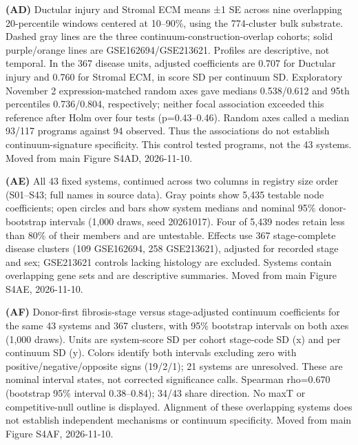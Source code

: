 \textbf{(AD)} Ductular injury and Stromal ECM means ±1 SE across nine overlapping 20-percentile windows centered at 10--90\%, using the 774-cluster bulk substrate. Dashed gray lines are the three continuum-construction-overlap cohorts; solid purple/orange lines are GSE162694/GSE213621. Profiles are descriptive, not temporal. In the 367 disease units, adjusted coefficients are 0.707 for Ductular injury and 0.760 for Stromal ECM, in score SD per continuum SD. Exploratory November 2 expression-matched random axes gave medians 0.538/0.612 and 95th percentiles 0.736/0.804, respectively; neither focal association exceeded this reference after Holm over four tests (p=0.43--0.46). Random axes called a median 93/117 programs against 94 observed. Thus the associations do not establish continuum-signature specificity. This control tested programs, not the 43 systems. Moved from main Figure S4AD, 2026-11-10.

\textbf{(AE)} All 43 fixed systems, continued across two columns in registry size order (S01--S43; full names in source data). Gray points show 5,435 testable node coefficients; open circles and bars show system medians and nominal 95\% donor-bootstrap intervals (1,000 draws, seed 20261017). Four of 5,439 nodes retain less than 80\% of their members and are untestable. Effects use 367 stage-complete disease clusters (109 GSE162694, 258 GSE213621), adjusted for recorded stage and sex; GSE213621 controls lacking histology are excluded. Systems contain overlapping gene sets and are descriptive summaries. Moved from main Figure S4AE, 2026-11-10.

\textbf{(AF)} Donor-first fibrosis-stage versus stage-adjusted continuum coefficients for the same 43 systems and 367 clusters, with 95\% bootstrap intervals on both axes (1,000 draws). Units are system-score SD per cohort stage-code SD (x) and per continuum SD (y). Colors identify both intervals excluding zero with positive/negative/opposite signs (19/2/1); 21 systems are unresolved. These are nominal interval states, not corrected significance calls. Spearman rho=0.670 (bootstrap 95\% interval 0.38--0.84); 34/43 share direction. No maxT or competitive-null outline is displayed. Alignment of these overlapping systems does not establish independent mechanisms or continuum specificity. Moved from main Figure S4AF, 2026-11-10.

